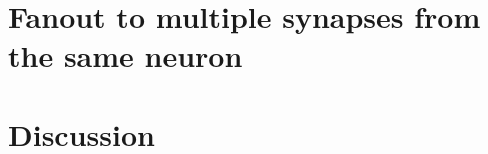 \documentclass[twocolumn]{article}
\begin{document}
\begin{figure} 
\end{figure}

\begin{figure} 
\end{figure}

\section{\label{sec:fluxonic_fanout}Fanout to multiple synapses from the same neuron}

\section{\label{sec:discussion}Discussion}
	
\newpage
\appendix



\end{document}
